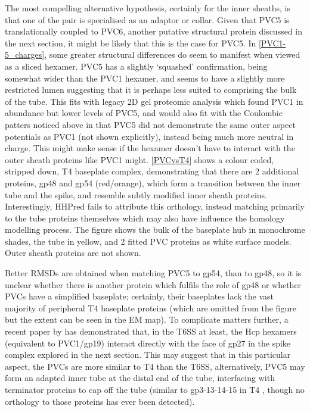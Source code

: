 The most compelling alternative hypothesis, certainly for the inner sheaths, is that one of the pair is specialised as an adaptor or collar. Given that PVC5 is translationally coupled to PVC6, another putative structural protein discussed in the next section, it might be likely that this is the case for PVC5. In \vref{PVC1-5_charges}, some greater structural differences do seem to manifest when viewed as a sliced hexamer. PVC5 has a slightly `squashed' confirmation, being somewhat wider than the PVC1 hexamer, and seems to have a slightly more restricted lumen suggesting that it is perhaps less suited to comprising the bulk of the tube. This fits with legacy 2D gel proteomic analysis which found PVC1 in abundance but lower levels of PVC5, and would also fit with the Coulombic patters noticed above in that PVC5 did not demonstrate the same outer aspect potentials as PVC1 (not shown explicitly), instead being much more neutral in charge. This might make sense if the hexamer doesn't have to interact with the outer sheath proteins like PVC1 might. \vref{PVCvsT4} shows a colour coded, stripped down, T4 baseplate complex, demonstrating that there are 2 additional proteins, gp48 and gp54 (red/orange), which form a transition between the inner tube and the spike, and resemble subtly modified inner sheath proteins. Interestingly, HHPred fails to attribute this orthology, instead matching primarily to the tube proteins themselves which may also have influence the homology modelling process. The figure shows the bulk of the baseplate hub in monochrome shades, the tube in yellow, and 2 fitted PVC proteins as white surface models. Outer sheath proteins are not shown.

Better RMSDs are obtained when matching PVC5 to gp54, than to gp48, so it is unclear whether there is another protein which fulfils the role of gp48 or whether PVCs have a simplified baseplate; certainly, their baseplates lack the vast majority of peripheral T4 baseplate proteins (which are omitted from the figure but the extent can be seen in the EM map). To complicate matters further, a recent paper by \cite{Renault2018} has demonstrated that, in the T6SS at least, the Hcp hexamers (equivalent to PVC1/gp19) interact directly with the face of gp27 in the spike complex explored in the next section. This may suggest that in this particular aspect, the PVCs are more similar to T4 than the T6SS, alternatively, PVC5 may form an adapted inner tube at the distal end of the tube, interfacing with terminator proteins to cap off the tube (similar to gp3-13-14-15 in T4 \citep{Fokine2013}, though no orthology to those proteins has ever been detected).

